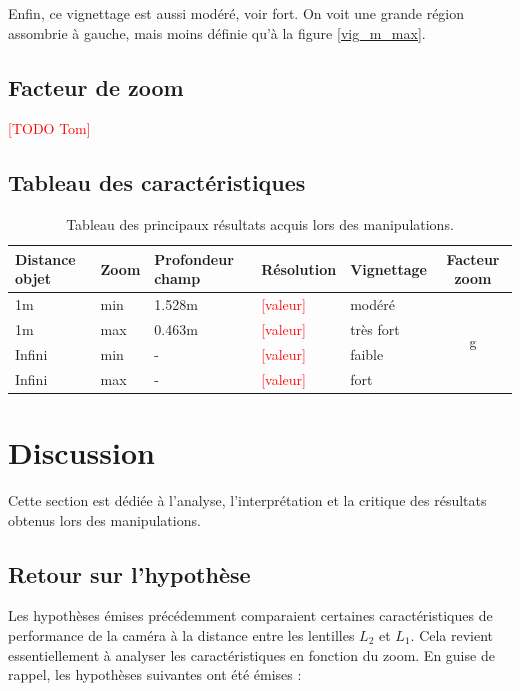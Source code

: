 \documentclass[11pt,letterpaper]{article}
\begin{document}
Enfin, ce vignettage est aussi modéré, voir fort. On voit une grande région 
assombrie à gauche, mais moins définie qu'à la figure \ref{vig_m_max}.

\subsection{Facteur de zoom}
\textcolor{red}{[TODO Tom]} 

\subsection{Tableau des caractéristiques}

\begin{table}[h]
\centering
\begin{tabular}{|l|l||l|l|l||c|}
\hline
\textbf{Distance objet} & \textbf{Zoom} & \textbf{Profondeur champ} & \textbf{Résolution} & \textbf{Vignettage} & \textbf{Facteur zoom} \\ \hline
1m & min  & 1.528m & \textcolor{red}{[valeur]} & modéré & \multirow{4}{*}{g} \\ \cline{1-5}
1m & max  & 0.463m & \textcolor{red}{[valeur]} & très fort & \\ \cline{1-5}
Infini & min  & - & \textcolor{red}{[valeur]} & faible & \\ \cline{1-5}
Infini & max  & - & \textcolor{red}{[valeur]} & fort & \\ \hline
\end{tabular}
\caption{Tableau des principaux résultats acquis lors des manipulations.}
\end{table}


\section{Discussion}

Cette section est dédiée à l'analyse, l'interprétation et la critique des résultats
obtenus lors des manipulations.

\subsection{Retour sur l'hypothèse}

Les hypothèses émises précédemment comparaient certaines caractéristiques de performance
de la caméra à la distance entre les lentilles $L_2$ et $L_1$. Cela revient 
essentiellement à analyser les caractéristiques en fonction du zoom. En guise de rappel,
les hypothèses suivantes ont été émises :
\end{document}
